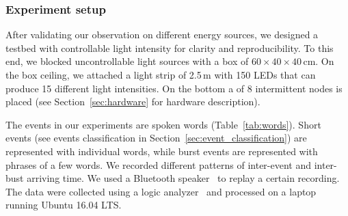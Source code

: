 \subsubsection{Experiment setup}
\label{sec:experiment_setup}
%
After validating our observation on different energy sources, we designed a testbed with controllable light intensity for clarity and reproducibility. To this end, we blocked uncontrollable light sources with a box of $60 \times 40 \times 40$\,cm. On the box ceiling, we attached a light strip of 2.5\,m with 150 LEDs that can produce 15 different light intensities. On the bottom a \fullCIM of 8 intermittent nodes is placed (see Section~\ref{sec:hardware} for hardware description).

The events in our experiments are spoken words (Table~\ref{tab:words}). 
Short events (see events classification in Section~\ref{sec:event_classification}) are represented with individual words, while burst events are represented with phrases of a few words.
We recorded different patterns of inter-event and inter-bust arriving time. We used a Bluetooth speaker~\cite{jbl} to replay a certain recording. The data were collected using a logic analyzer~\cite{saleae} and processed on a laptop running Ubuntu 16.04 LTS. 
%

